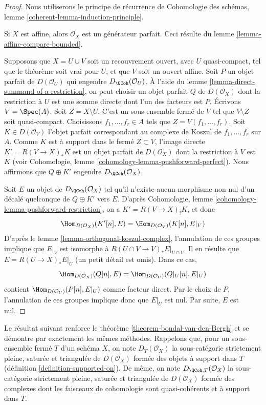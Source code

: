 \begin{proof}
Nous utiliserons le principe de récurrence de
Cohomologie des schémas, lemme \ref{coherent-lemma-induction-principle}.

\medskip\noindent
Si $X$ est affine, alors $\mathcal{O}_X$ est un générateur parfait.
Ceci résulte du lemme \ref{lemma-affine-compare-bounded}.

\medskip\noindent
Supposons que $X = U \cup V$ soit un recouvrement ouvert, avec $U$ quasi-compact,
tel que le théorème soit vrai pour $U$, et que $V$ soit un ouvert affine.
Soit $P$ un objet parfait de $D(\mathcal{O}_U)$ qui engendre
$D_\QCoh(\mathcal{O}_U)$. À l'aide du
lemme \ref{lemma-direct-summand-of-a-restriction}, on peut
choisir un objet parfait
$Q$ de $D(\mathcal{O}_X)$ dont la restriction à $U$ est une somme directe dont
l'un des facteurs est $P$. Écrivons $V = \Spec(A)$. Soit $Z = X \setminus U$.
C'est un sous-ensemble fermé de $V$ tel que $V \setminus Z$ soit quasi-compact.
Choisissons $f_1, \ldots, f_r \in A$ tels que
$Z = V(f_1, \ldots, f_r)$. Soit $K \in D(\mathcal{O}_V)$ l'objet parfait
correspondant au complexe de Koszul de $f_1, \ldots, f_r$ sur $A$.
Comme $K$ est à support dans le fermé $Z \subset V$, l'image directe
$K' = R(V \to X)_*K$ est un objet parfait de $D(\mathcal{O}_X)$ dont la
restriction à $V$ est $K$ (voir
Cohomologie, lemme \ref{cohomology-lemma-pushforward-perfect}).
Nous affirmons que $Q \oplus K'$ engendre
$D_\QCoh(\mathcal{O}_X)$.

\medskip\noindent
Soit $E$ un objet de $D_\QCoh(\mathcal{O}_X)$ tel qu'il
n'existe aucun morphisme non nul d'un décalé quelconque de $Q \oplus K'$ vers $E$.
D'après Cohomologie, lemme \ref{cohomology-lemma-pushforward-restriction},
on a $K' =  R(V \to X)_! K$, et donc
$$
\Hom_{D(\mathcal{O}_X)}(K'[n], E) = \Hom_{D(\mathcal{O}_V)}(K[n], E|_V)
$$
D'après le lemme \ref{lemma-orthogonal-koszul-complex}, l'annulation de
ces groupes implique que $E|_V$ est isomorphe à
$R(U \cap V \to V)_*E|_{U \cap V}$. Il en résulte que $E = R(U \to X)_*E|_U$
(un petit détail est omis). Dans ce cas,
$$
\Hom_{D(\mathcal{O}_X)}(Q[n], E) = \Hom_{D(\mathcal{O}_U)}(Q|_U[n], E|_U)
$$
contient $\Hom_{D(\mathcal{O}_U)}(P[n], E|_U)$ comme facteur direct.
Par le choix de $P$, l'annulation de ces groupes implique donc que $E|_U$
est nul. Par suite, $E$ est nul.
\end{proof}

\noindent
Le résultat suivant renforce le
théorème \ref{theorem-bondal-van-den-Bergh}
et se démontre par exactement les mêmes méthodes.
Rappelons que, pour un sous-ensemble fermé $T$ d'un schéma $X$, on note
$D_T(\mathcal{O}_X)$ la sous-catégorie strictement pleine, saturée
et triangulée de $D(\mathcal{O}_X)$ formée des objets
à support dans $T$ (définition \ref{definition-supported-on}).
De même, on note $D_{\QCoh, T}(\mathcal{O}_X)$ la sous-catégorie strictement pleine, saturée
et triangulée de $D(\mathcal{O}_X)$ formée des
complexes dont les faisceaux de cohomologie sont quasi-cohérents et à support
dans $T$.

